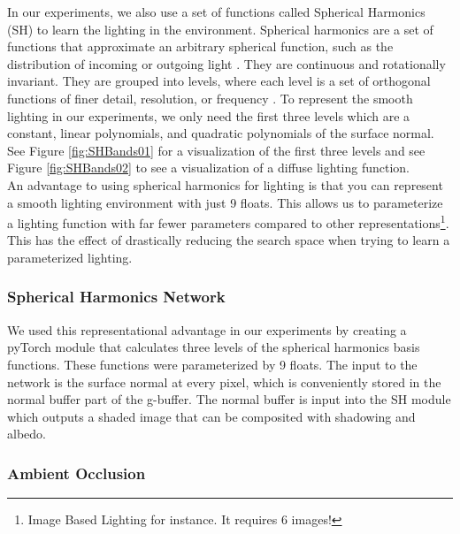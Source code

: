\documentclass[10pt,twocolumn,letterpaper]{article}
\begin{document}
In our experiments, we also use a set of functions called Spherical Harmonics (SH) to learn the lighting in the environment. Spherical harmonics are a set of functions that approximate an arbitrary spherical function, such as the distribution of incoming or outgoing light \cite{Ramamoorthi:2001:ERI:383259.383317}.  They are continuous and rotationally invariant. They are grouped into levels, where each level is a set of orthogonal functions of finer detail, resolution, or frequency \cite{Shreiner:2013:OPG:2544032}.  To represent the smooth lighting in our experiments, we only need the first three levels which are a constant, linear polynomials, and quadratic polynomials of the surface normal.\\

See Figure \ref{fig:SHBands01} for a visualization of the first three levels and see Figure \ref{fig:SHBands02} to see a visualization of a diffuse lighting function.\\

An advantage to using spherical harmonics for lighting is that you can represent a smooth lighting environment with just 9 floats.  This allows us to parameterize a lighting function with far fewer parameters compared to other representations\footnote{Image Based Lighting for instance.  It requires 6 images!}. This has the effect of drastically reducing the search space when trying to learn a parameterized lighting.

\subsubsection{Spherical Harmonics Network}

We used this representational advantage in our experiments by creating a pyTorch \cite{PYTORCH} module that calculates three levels of the spherical harmonics basis functions.  These functions were parameterized by 9 floats.  The input to the network is the surface normal at every pixel, which is conveniently stored in the normal buffer part of the g-buffer. The normal buffer is input into the SH module which outputs a shaded image that can be composited with shadowing and albedo.

\subsubsection{Ambient Occlusion}
\end{document}
